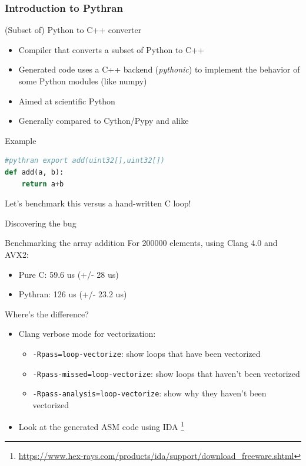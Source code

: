 \begin{frame}[fragile]
  \frametitle{Introduction to Pythran}
  \begin{block}{(Subset of) Python to C++ converter}
    \begin{itemize}
      \item Compiler that converts a subset of Python to C++
      \item Generated code uses a C++ backend ({\it pythonic}) to implement the
        behavior of some Python modules (like numpy)
      \item Aimed at scientific Python
      \item Generally compared to Cython/Pypy and alike
    \end{itemize}
  \end{block}

  \pause

  \begin{alertblock}{Example}
    \begin{lstlisting}[language=python]
#pythran export add(uint32[],uint32[])
def add(a, b):
    return a+b
    \end{lstlisting}
    \begin{center}
      Let's benchmark this versus a hand-written C loop!
    \end{center}
  \end{alertblock}
\end{frame}

\begin{frame}{Discovering the bug}
  \begin{block}{Benchmarking the array addition}
    For 200000 elements, using Clang 4.0 and AVX2:
    \begin{itemize}
      \item Pure C: 59.6 us (+/- 28 us)
      \item Pythran: 126 us (+/- 23.2 us)
    \end{itemize}
  \end{block}

  \pause

  \begin{alertblock}{Where's the difference?}
    \begin{itemize}
      \item Clang verbose mode for vectorization:
        \begin{itemize}
          \item {\tt -Rpass=loop-vectorize}: show loops that have been vectorized
          \item {\tt -Rpass-missed=loop-vectorize}: show loops that haven't been vectorized
          \item {\tt -Rpass-analysis=loop-vectorize}: show why they haven't been vectorized
        \end{itemize}
      \item Look at the generated ASM code using IDA
        \footnote{\url{https://www.hex-rays.com/products/ida/support/download\_freeware.shtml}}
    \end{itemize}
  \end{alertblock}
\end{frame}

